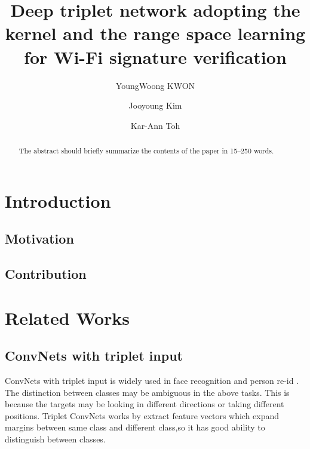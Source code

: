\documentclass[runningheads]{llncs}
\begin{document}
%
\title{Deep triplet network adopting the kernel and the range space learning for Wi-Fi signature verification}
%
%
\author{YoungWoong KWON \and
Jooyoung Kim  \and
Kar-Ann Toh}
%
%
%
\maketitle              %
%
\begin{abstract}
The abstract should briefly summarize the contents of the paper in
15--250 words.

\end{abstract}
%
%
%
\section{Introduction}

\subsection{Motivation}

\subsection{Contribution}

\section{Related Works}


\subsection{ConvNets with triplet input}
ConvNets with triplet input is widely used in face recognition \cite{schroff2015facenet} and person re-id \cite{cheng2016person,chen2017beyond}.
The distinction between classes may be ambiguous in the above tasks. This is because the targets may be looking in different directions or taking different positions.
Triplet ConvNets works by extract feature vectors which expand margins between same class and different class,so it has good ability to distinguish between classes. 
\end{document}
